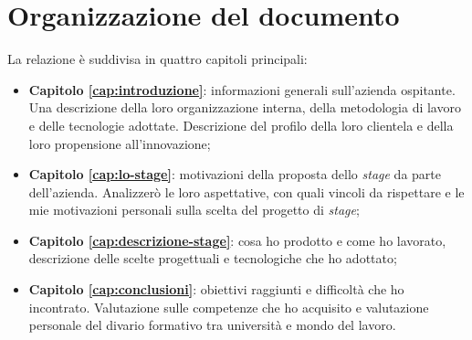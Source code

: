 \section*{Organizzazione del documento}
La relazione è suddivisa in quattro capitoli principali:
\begin{itemize}
    \item \textbf{Capitolo \ref{cap:introduzione}}: informazioni generali sull'azienda ospitante. Una descrizione della loro organizzazione interna, della metodologia di lavoro e delle tecnologie adottate. Descrizione del profilo della loro clientela e della loro propensione all'innovazione;
    \item \textbf{Capitolo \ref{cap:lo-stage}}: motivazioni della proposta dello \textit{stage} da parte dell'azienda. Analizzerò le loro aspettative, con quali vincoli da rispettare e le mie motivazioni personali sulla scelta del progetto di \textit{stage};
    \item \textbf{Capitolo \ref{cap:descrizione-stage}}: cosa ho prodotto e come ho lavorato, descrizione delle scelte progettuali e tecnologiche che ho adottato;
    \item \textbf{Capitolo \ref{cap:conclusioni}}: obiettivi raggiunti e difficoltà che ho incontrato. Valutazione sulle competenze che ho acquisito e valutazione personale del divario formativo tra università e mondo del lavoro.
\end{itemize}




\endgroup

\vfill
